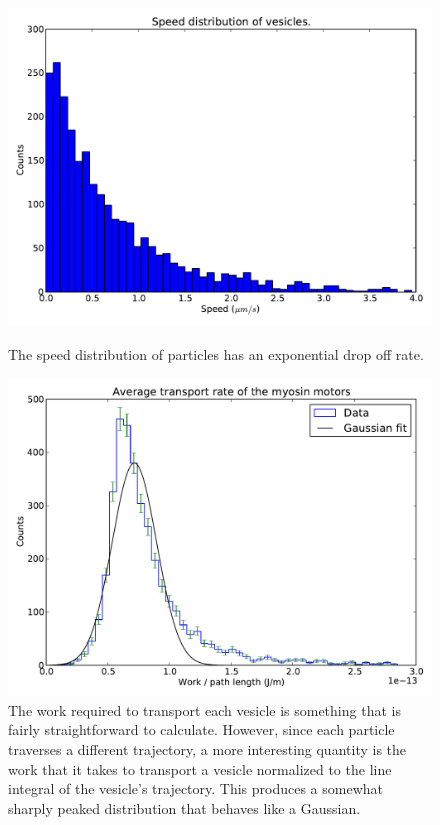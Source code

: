 \documentclass[11pt,letterpaper]{article}
\begin{document}
\begin{figure}
    \centering
    \begin{minipage}[t]{0.485\textwidth}
        \centering
        \includegraphics[width=\textwidth]{figures/red_onion_test_17_speeds.pdf}
        \caption{The speed distribution of particles has an exponential drop off
            rate.}
        \label{speed_dist}
    \end{minipage}
    \begin{minipage}[t]{0.485\textwidth}
        \centering
        \includegraphics[width=\textwidth]{figures/red_onion_test_17_workrate.pdf}
        \caption{The work required to transport each vesicle is something that
            is fairly straightforward to calculate. However, since each particle
            traverses a different trajectory, a more interesting quantity is the
            work that it takes to transport a vesicle normalized to the line
            integral of the vesicle's trajectory. This produces a somewhat
            sharply peaked distribution that behaves like a Gaussian.}
        \label{work_rate}
    \end{minipage}
\end{figure}
\end{document}
